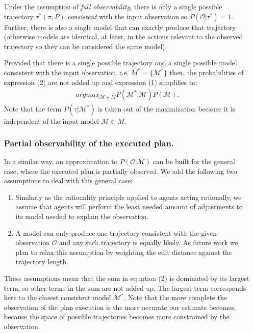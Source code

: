 \documentclass[letterpaper]{article} %
\begin{document}
Under the assumption of {\em full observability}, there is only a single possible trajectory $\tau^*(\pi,P)$ {\em consistent} with the input observation so $P(\mathcal{O}|\tau^*)=1$. Further, there is also a single model that can exactly produce that trajectory (otherwise models are identical, at least, in the actions relevant to the observed trajectory so they can be considered the same model).

Provided that there is a single possible trajectory and a single possible model consistent with the input observation, i.e. $M^*=\{\mathcal{M}^*\}$ then, the probabilities of expression (2) are not added up and expression (1) simplifies to:
\begin{align}
argmax_{\mathcal{M}\in M} P(\mathcal{M^*}|\mathcal{M}) P(\mathcal{M}).
\end{align}
Note that the term $P(\tau|\mathcal{M^*})$ is taken out of the maximization because it is independent of the input model $\mathcal{M}\in M$.

\subsubsection{Partial observability of the executed plan.} In a similar way, an approximation to $P(\mathcal{O}|\mathcal{M})$ can be built for the general case, where the executed plan is partially observed. We add the following two assumptions to deal with this general case:

\begin{enumerate}
\item Similarly as the rationality principle \cite{Dennett83} applied to agents acting rationally, we assume that agents will perform the least needed amount of adjustments to its model needed to explain the observation.
\item A model can only produce one trajectory consistent with the given observation $\mathcal{O}$ and any such trajectory is equally likely. As future work we plan to relax this assumption by weighting the edit distance against the trajectory length.
\end{enumerate}

These assumptions mean that the sum in equation (2) is dominated by its largest term, so other terms in the sum are not added up. The largest term corresponds here to the closest consistent model $\mathcal{M^*}$. Note that the more complete the observation of the plan execution
is the more accurate our estimate becomes, because the space of possible trajectories becomes more constrained by the observation.
\end{document}
